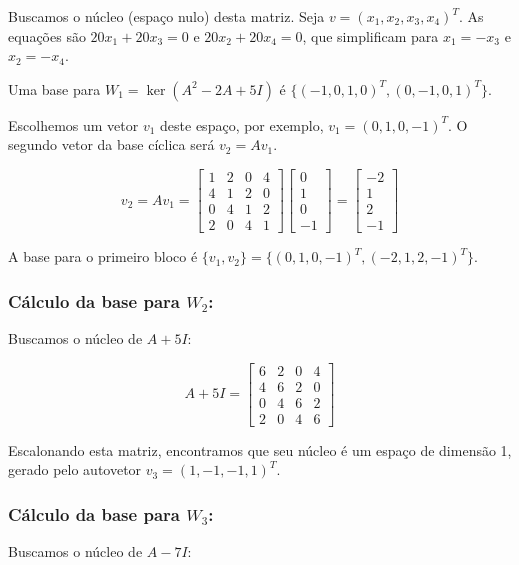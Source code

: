 Buscamos o núcleo (espaço nulo) desta matriz. Seja $v=(x_1,x_2,x_3,x_4)^T$. As equações são
$20x_1+20x_3=0$ e $20x_2+20x_4=0$, que simplificam para $x_1=-x_3$ e $x_2=-x_4$.

Uma base para $W_1=\ker(A^2-2A+5I)$ é $\{(-1,0,1,0)^T,(0,-1,0,1)^T\}$.

Escolhemos um vetor $v_1$ deste espaço, por exemplo, $v_1=(0,1,0,-1)^T$. O segundo vetor da base
cíclica será $v_2=Av_1$.

\[
v_2 = Av_1 =
\begin{bmatrix}
1 & 2 & 0 & 4 \\
4 & 1 & 2 & 0 \\
0 & 4 & 1 & 2 \\
2 & 0 & 4 & 1
\end{bmatrix}
\begin{bmatrix}
0 \\ 1 \\ 0 \\ -1
\end{bmatrix}
=
\begin{bmatrix}
-2 \\ 1 \\ 2 \\ -1
\end{bmatrix}
\]

A base para o primeiro bloco é $\{v_1,v_2\}=\{(0,1,0,-1)^T,(-2,1,2,-1)^T\}$.

\subsubsection*{Cálculo da base para $W_2$:}

Buscamos o núcleo de $A+5I$:

\[
A+5I =
\begin{bmatrix}
6 & 2 & 0 & 4 \\
4 & 6 & 2 & 0 \\
0 & 4 & 6 & 2 \\
2 & 0 & 4 & 6
\end{bmatrix}
\]

Escalonando esta matriz, encontramos que seu núcleo é um espaço de dimensão 1, gerado pelo
autovetor $v_3=(1,-1,-1,1)^T$.

\subsubsection*{Cálculo da base para $W_3$:}

Buscamos o núcleo de $A-7I$:

